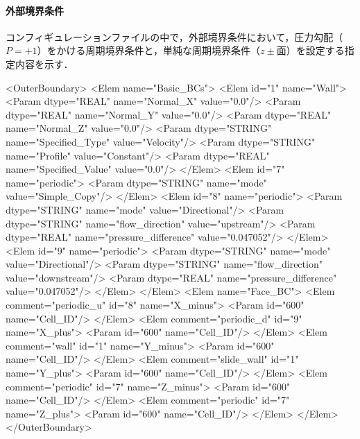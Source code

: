 \paragraph{外部境界条件}コンフィギュレーションファイルの中で，外部境界条件において，圧力勾配（$P=+1$）をかける周期境界条件と，単純な周期境界条件（$z\pm$面）を設定する指定内容を示す．
{\small
\begin{program}
         <OuterBoundary>
            <Elem name="Basic_BCs">
                <Elem id="1" name="Wall">
                    <Param dtype="REAL" name="Normal_X" value="0.0"/>
                    <Param dtype="REAL" name="Normal_Y" value="0.0"/>
                    <Param dtype="REAL" name="Normal_Z" value="0.0"/>
                    <Param dtype="STRING" name="Specified_Type" value="Velocity"/>
                    <Param dtype="STRING" name="Profile" value="Constant"/>
                    <Param dtype="REAL" name="Specified_Value" value="0.0"/>
                </Elem>
                <Elem id="7" name="periodic">
                    <Param dtype="STRING" name="mode" value="Simple_Copy"/>
                </Elem>
                <Elem id="8" name="periodic">
                    <Param dtype="STRING" name="mode" value="Directional"/>
                    <Param dtype="STRING" name="flow_direction" value="upstream"/>
                    <Param dtype="REAL" name="pressure_difference" value="0.047052"/>
                </Elem>
                <Elem id="9" name="periodic">
                    <Param dtype="STRING" name="mode" value="Directional"/>
                    <Param dtype="STRING" name="flow_direction" value="downstream"/>
                    <Param dtype="REAL" name="pressure_difference" value="0.047052"/>
                </Elem>
            </Elem>
            <Elem name="Face_BC">
                <Elem comment="periodic_u" id="8" name="X_minus">
                    <Param id="600" name="Cell_ID"/>
                </Elem>
                <Elem comment="periodic_d" id="9" name="X_plus">
                    <Param id="600" name="Cell_ID"/>
                </Elem>
                <Elem comment="wall" id="1" name="Y_minus">
                    <Param id="600" name="Cell_ID"/>
                </Elem>
                <Elem comment="slide_wall" id="1" name="Y_plus">
                    <Param id="600" name="Cell_ID"/>
                </Elem>
                <Elem comment="periodic" id="7" name="Z_minus">
                    <Param id="600" name="Cell_ID"/>
                </Elem>
                <Elem comment="periodic" id="7" name="Z_plus">
                    <Param id="600" name="Cell_ID"/>
                </Elem>
            </Elem>
       </OuterBoundary>
\end{program}
}


